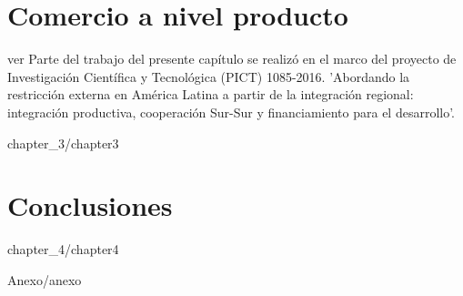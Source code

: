 \documentclass[11pt,a4paper]{tesis}
\begin{document}

\chapter[Comercio a nivel producto]{Comercio a nivel producto} \label{sec:desagregado}


ver
Parte del trabajo del presente capítulo se realizó en el marco  del proyecto de Investigación Científica y Tecnológica (PICT) 1085-2016. 'Abordando la restricción externa en América Latina a partir de la integración regional: integración productiva, cooperación Sur-Sur y financiamiento para el desarrollo'.

{chapter_3/chapter3}



\chapter{Conclusiones} \label{sec:conclusiones}


{chapter_4/chapter4}

\appendix \label{append}

{Anexo/anexo}



\backmatter
%


%
\end{document}
